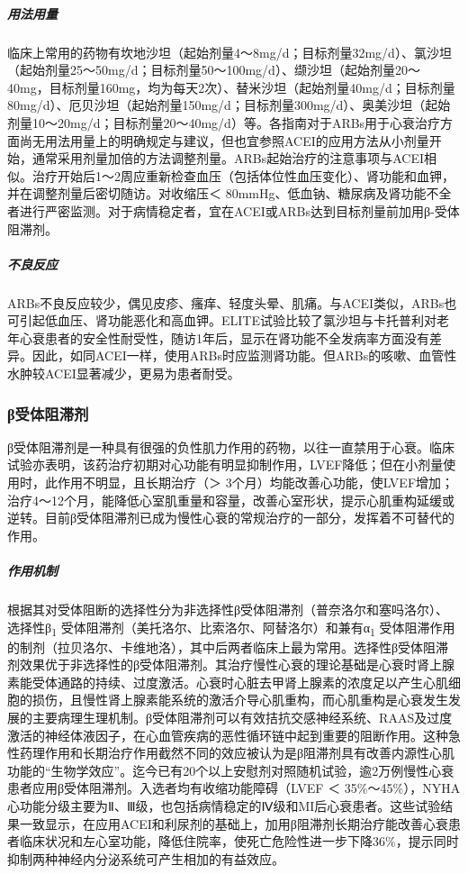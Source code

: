 \subparagraph{用法用量}

临床上常用的药物有坎地沙坦（起始剂量4～8mg/d；目标剂量32mg/d）、氯沙坦（起始剂量25～50mg/d；目标剂量50～100mg/d）、缬沙坦（起始剂量20～40mg，目标剂量160mg，均为每天2次）、替米沙坦（起始剂量40mg/d；目标剂量80mg/d）、厄贝沙坦（起始剂量150mg/d；目标剂量300mg/d）、奥美沙坦（起始剂量10～20mg/d；目标剂量20～40mg/d）等。各指南对于ARBs用于心衰治疗方面尚无用法用量上的明确规定与建议，但也宜参照ACEI的应用方法从小剂量开始，通常采用剂量加倍的方法调整剂量。ARBs起始治疗的注意事项与ACEI相似。治疗开始后1～2周应重新检查血压（包括体位性血压变化）、肾功能和血钾，并在调整剂量后密切随访。对收缩压＜
80mmHg、低血钠、糖尿病及肾功能不全者进行严密监测。对于病情稳定者，宜在ACEI或ARBs达到目标剂量前加用β-受体阻滞剂。

\subparagraph{不良反应}

ARBs不良反应较少，偶见皮疹、瘙痒、轻度头晕、肌痛。与ACEI类似，ARBs也可引起低血压、肾功能恶化和高血钾。ELITE试验比较了氯沙坦与卡托普利对老年心衰患者的安全性耐受性，随访1年后，显示在肾功能不全发病率方面没有差异。因此，如同ACEI一样，使用ARBs时应监测肾功能。但ARBs的咳嗽、血管性水肿较ACEI显著减少，更易为患者耐受。

\subsubsection{β受体阻滞剂}

β受体阻滞剂是一种具有很强的负性肌力作用的药物，以往一直禁用于心衰。临床试验亦表明，该药治疗初期对心功能有明显抑制作用，LVEF降低；但在小剂量使用时，此作用不明显，且长期治疗（＞
3个月）均能改善心功能，使LVEF增加；治疗4～12个月，能降低心室肌重量和容量，改善心室形状，提示心肌重构延缓或逆转。目前β受体阻滞剂已成为慢性心衰的常规治疗的一部分，发挥着不可替代的作用。

\subparagraph{作用机制}

根据其对受体阻断的选择性分为非选择性β受体阻滞剂（普奈洛尔和塞吗洛尔）、选择性β\textsubscript{1}
受体阻滞剂（美托洛尔、比索洛尔、阿替洛尔）和兼有α\textsubscript{1}
受体阻滞作用的制剂（拉贝洛尔、卡维地洛），其中后两者临床上最为常用。选择性β受体阻滞剂效果优于非选择性的β受体阻滞剂。其治疗慢性心衰的理论基础是心衰时肾上腺素能受体通路的持续、过度激活。心衰时心脏去甲肾上腺素的浓度足以产生心肌细胞的损伤，且慢性肾上腺素能系统的激活介导心肌重构，而心肌重构是心衰发生发展的主要病理生理机制。β受体阻滞剂可以有效拮抗交感神经系统、RAAS及过度激活的神经体液因子，在心血管疾病的恶性循环链中起到重要的阻断作用。这种急性药理作用和长期治疗作用截然不同的效应被认为是β阻滞剂具有改善内源性心肌功能的“生物学效应”。迄今已有20个以上安慰剂对照随机试验，逾2万例慢性心衰患者应用β受体阻滞剂。入选者均有收缩功能障碍（LVEF
＜
35\%～45\%），NYHA心功能分级主要为Ⅱ、Ⅲ级，也包括病情稳定的Ⅳ级和MI后心衰患者。这些试验结果一致显示，在应用ACEI和利尿剂的基础上，加用β阻滞剂长期治疗能改善心衰患者临床状况和左心室功能，降低住院率，使死亡危险性进一步下降36\%，提示同时抑制两种神经内分泌系统可产生相加的有益效应。

